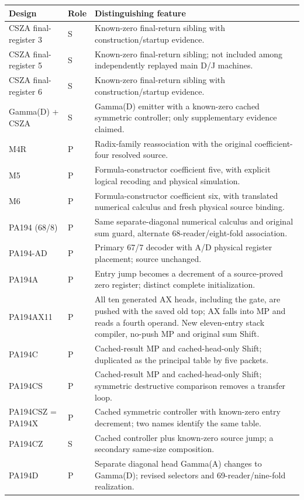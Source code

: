 \begin{longtable}{p{.22\linewidth}p{.06\linewidth}p{.63\linewidth}}
\toprule Design & Role & Distinguishing feature\\\midrule\endhead
CSZA final-register 3 & S & Known-zero final-return sibling with construction/startup evidence.\\
CSZA final-register 5 & S & Known-zero final-return sibling; not included among independently replayed main D/J machines.\\
CSZA final-register 6 & S & Known-zero final-return sibling with construction/startup evidence.\\
Gamma(D) + CSZA & S & Gamma(D) emitter with a known-zero cached symmetric controller; only supplementary evidence claimed.\\
M4R & P & Radix-family reassociation with the original coefficient-four resolved source.\\
M5 & P & Formula-constructor coefficient five, with explicit logical recoding and physical simulation.\\
M6 & P & Formula-constructor coefficient six, with translated numerical calculus and fresh physical source binding.\\
PA194 (68/8) & P & Same separate-diagonal numerical calculus and original sum guard, alternate 68-reader/eight-fold association.\\
PA194-AD & P & Primary 67/7 decoder with A/D physical register placement; source unchanged.\\
PA194A & P & Entry jump becomes a decrement of a source-proved zero register; distinct complete initialization.\\
PA194AX11 & P & All ten generated AX heads, including the gate, are pushed with the saved old top; AX falls into MP and reads a fourth operand. New eleven-entry stack compiler, no-push MP and original sum Shift.\\
PA194C & P & Cached-result MP and cached-head-only Shift; duplicated as the principal table by five packets.\\
PA194CS & P & Cached-result MP and cached-head-only Shift; symmetric destructive comparison removes a transfer loop.\\
PA194CSZ = PA194X & P & Cached symmetric controller with known-zero entry decrement; two names identify the same table.\\
PA194CZ & S & Cached controller plus known-zero source jump; a secondary same-size composition.\\
PA194D & P & Separate diagonal head Gamma(A) changes to Gamma(D); revised selectors and 69-reader/nine-fold realization.\\

\end{longtable}
